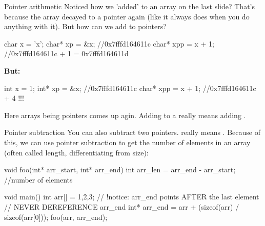\documentclass[10pt,graphics,aspectratio=169,table]{beamer}
\begin{document}
\begin{frame}[fragile]{Pointer arithmetic}
    Noticed how we 'added' to an array on the last slide?
    That's because the array decayed to a pointer again 
    (like it always does when you do anything with it).
    But how can we add to pointers?
    \begin{codeblock} 
char x = 'x';
char* xp = &x; //0x7fffd164611c
char* xpp = x + 1;  //0x7fffd164611c + 1 = 0x7fffd164611d
    \end{codeblock} 

    \textbf{But:} 
    \begin{codeblock} 
int x = 1;
int* xp = &x; //0x7fffd164611c
char* xpp = x + 1;  //0x7fffd164611c + 4  !!!
    \end{codeblock}

    Here arrays being pointers comes up agin. 
    Adding  to a  really means adding .
\end{frame}

\begin{frame}[fragile]{Pointer subtraction}
    You can also subtract two pointers. 
     really means .
    Because of this, we can use pointer subtraction 
    to get the number of elements in an array 
    (often called length, differentiating from size):
    \begin{codeblock} 
void foo(int* arr_start, int* arr_end){ 
   int arr_len = arr_end  - arr_start; //number of elements
}
        
void main(){
    int arr[] = {1,2,3};
    // !notice: arr_end points AFTER the last element
    // NEVER DEREFERENCE arr_end
    int* arr_end = arr + (sizeof(arr) / sizeof(arr[0]));
    foo(arr, arr_end);
}
    \end{codeblock} 
        
\end{frame}

\end{document}
